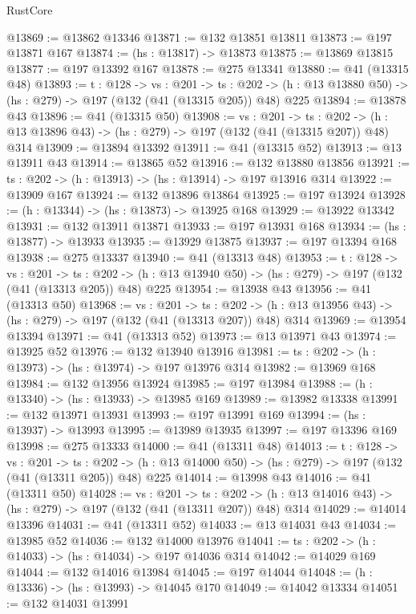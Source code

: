 \begin{lexlean}{RustCore}
\begin{coremodule}
@13869 := @13862 @13346
@13871 := @132 @13851 @13811
@13873 := @197 @13871 @167
@13874 := (hs : @13817) -> @13873
@13875 := @13869 @13815
@13877 := @197 @13392 @167
@13878 := @275 @13341
@13880 := @41 (@13315 @48)
@13893 := {t : @128} ->
  {vs : @201} ->
  {ts : @202} -> (h : @13 @13880 @50) -> (hs : @279) -> @197 (@132 (@41 (@13315 @205)) @48) @225
@13894 := @13878 @43
@13896 := @41 (@13315 @50)
@13908 := {vs : @201} ->
  {ts : @202} -> (h : @13 @13896 @43) -> (hs : @279) -> @197 (@132 (@41 (@13315 @207)) @48) @314
@13909 := @13894 @13392
@13911 := @41 (@13315 @52)
@13913 := @13 @13911 @43
@13914 := @13865 @52
@13916 := @132 @13880 @13856
@13921 := {ts : @202} -> (h : @13913) -> (hs : @13914) -> @197 @13916 @314
@13922 := @13909 @167
@13924 := @132 @13896 @13864
@13925 := @197 @13924
@13928 := (h : @13344) -> (hs : @13873) -> @13925 @168
@13929 := @13922 @13342
@13931 := @132 @13911 @13871
@13933 := @197 @13931 @168
@13934 := (hs : @13877) -> @13933
@13935 := @13929 @13875
@13937 := @197 @13394 @168
@13938 := @275 @13337
@13940 := @41 (@13313 @48)
@13953 := {t : @128} ->
  {vs : @201} ->
  {ts : @202} -> (h : @13 @13940 @50) -> (hs : @279) -> @197 (@132 (@41 (@13313 @205)) @48) @225
@13954 := @13938 @43
@13956 := @41 (@13313 @50)
@13968 := {vs : @201} ->
  {ts : @202} -> (h : @13 @13956 @43) -> (hs : @279) -> @197 (@132 (@41 (@13313 @207)) @48) @314
@13969 := @13954 @13394
@13971 := @41 (@13313 @52)
@13973 := @13 @13971 @43
@13974 := @13925 @52
@13976 := @132 @13940 @13916
@13981 := {ts : @202} -> (h : @13973) -> (hs : @13974) -> @197 @13976 @314
@13982 := @13969 @168
@13984 := @132 @13956 @13924
@13985 := @197 @13984
@13988 := (h : @13340) -> (hs : @13933) -> @13985 @169
@13989 := @13982 @13338
@13991 := @132 @13971 @13931
@13993 := @197 @13991 @169
@13994 := (hs : @13937) -> @13993
@13995 := @13989 @13935
@13997 := @197 @13396 @169
@13998 := @275 @13333
@14000 := @41 (@13311 @48)
@14013 := {t : @128} ->
  {vs : @201} ->
  {ts : @202} -> (h : @13 @14000 @50) -> (hs : @279) -> @197 (@132 (@41 (@13311 @205)) @48) @225
@14014 := @13998 @43
@14016 := @41 (@13311 @50)
@14028 := {vs : @201} ->
  {ts : @202} -> (h : @13 @14016 @43) -> (hs : @279) -> @197 (@132 (@41 (@13311 @207)) @48) @314
@14029 := @14014 @13396
@14031 := @41 (@13311 @52)
@14033 := @13 @14031 @43
@14034 := @13985 @52
@14036 := @132 @14000 @13976
@14041 := {ts : @202} -> (h : @14033) -> (hs : @14034) -> @197 @14036 @314
@14042 := @14029 @169
@14044 := @132 @14016 @13984
@14045 := @197 @14044
@14048 := (h : @13336) -> (hs : @13993) -> @14045 @170
@14049 := @14042 @13334
@14051 := @132 @14031 @13991

\end{coremodule}
\end{lexlean}
